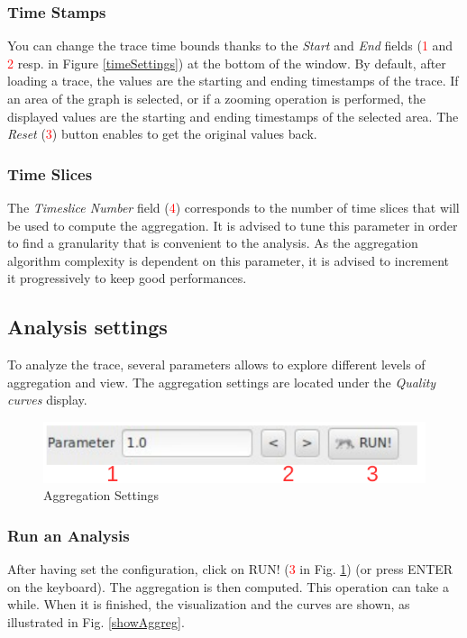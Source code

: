 \documentclass[twoside]{article}
\begin{document}
\begin{sloppypar}
\subsubsection{Time Stamps}
You can change the trace time bounds thanks to the \textit{Start} and \textit{End} fields (\textcolor{red}{1} and \textcolor{red}{2} resp. in Figure \ref{timeSettings}) at the bottom of the window. By default, after loading a trace, the values are the starting and ending timestamps of the trace. If an area of the graph is selected, or if a zooming operation is performed, the displayed values are the starting and ending timestamps of the selected area. The \textit{Reset} (\textcolor{red}{3}) button enables to get the original values back.

\subsubsection{Time Slices}
The \textit{Timeslice Number} field (\textcolor{red}{4}) corresponds to the number of time slices that will be used to compute the aggregation. It is advised to tune this parameter in order to find a granularity that is convenient to the analysis. As the aggregation algorithm complexity is dependent on this parameter, it is advised to increment it progressively to keep good performances.

\subsection{Analysis settings}
To analyze the trace, several parameters allows to explore  different levels of aggregation and view. The aggregation settings are located under the \textit{Quality curves} display.
 
\begin{figure}[h!]
	\centering
	\includegraphics[scale=0.8]{images/aggregationSettings.pdf}
	\caption{Aggregation Settings}
	\label{aggregSettings}
\end{figure}

\subsubsection{Run an Analysis}
After having set the configuration, click on RUN! (\textcolor{red}{3} in Fig. \ref{aggregSettings}) (or press ENTER on the keyboard). The aggregation is then computed. This operation can take a while. When it is finished, the visualization and the curves are shown, as illustrated in Fig. \ref{showAggreg}.



\end{sloppypar}
\end{document}
